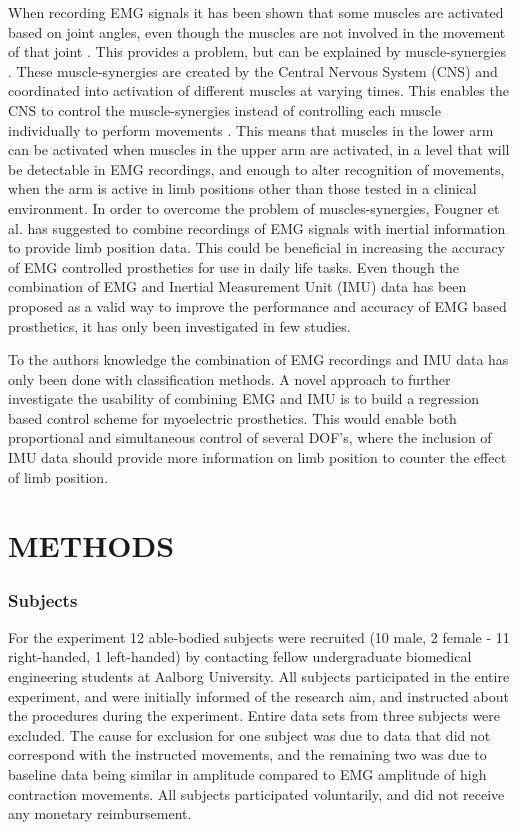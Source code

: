\begin{multicols}{2}
When recording EMG signals it has been shown that some muscles are activated based on joint angles, even though the muscles are not involved in the movement of that joint \cite{Fougner2011}. This provides a problem, but can be explained by muscle-synergies \cite{DeRugy2013}. These muscle-synergies are created by the Central Nervous System (CNS) and coordinated into activation of different muscles at varying times. This enables the CNS to control the muscle-synergies instead of controlling each muscle individually to perform movements \cite{jiang2009}. This means that muscles in the lower arm can be activated when muscles in the upper arm are activated, in a level that will be detectable in EMG recordings, and enough to alter recognition of movements, when the arm is active in limb positions other than those tested in a clinical environment. 
In order to overcome the problem of muscles-synergies, Fougner et al. \cite{Fougner2011} has suggested to combine recordings of EMG signals with inertial information to provide limb position data. This could be beneficial in increasing the accuracy of EMG controlled prosthetics for use in daily life tasks. 
Even though the combination of EMG and Inertial Measurement Unit (IMU) data has been proposed as a valid way to improve the performance and accuracy of EMG based prosthetics, it has only been investigated in few studies. \cite{Roy2010, Imtiaz2014, jiang2012}

To the authors knowledge the combination of EMG recordings and IMU data has only been done with classification methods. A novel approach to further investigate the usability of combining EMG and IMU is to build a regression based control scheme for myoelectric prosthetics. This would enable both proportional and simultaneous control of several DOF's, where the inclusion of IMU data should provide more information on limb position to counter the effect of limb position.		
	
\section*{METHODS}%
	
%		
\subsubsection*{Subjects}
For the experiment 12 able-bodied subjects were recruited (10 male, 2 female - 11 right-handed, 1 left-handed) by contacting fellow undergraduate biomedical engineering students at Aalborg University. All subjects participated in the entire experiment, and were initially informed of the research aim, and instructed about the procedures during the experiment. Entire data sets from three subjects were excluded. The cause for exclusion for one subject was due to data that did not correspond with the instructed movements, and the remaining two was due to baseline data being similar in amplitude compared to EMG amplitude of high contraction movements. All subjects participated voluntarily, and did not receive any monetary reimbursement. 


\end{multicols}
